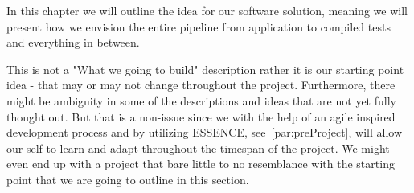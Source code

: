 In this chapter we will outline the idea for our software solution, meaning we will present how we envision the entire pipeline from application to compiled tests and everything in between.

This is not a "What we going to build" description rather it is our starting point idea - that may or may not change throughout the project.
Furthermore, there might be ambiguity in some of the descriptions and ideas that are not yet fully thought out.
But that is a non-issue since we with the help of an agile inspired development process and by utilizing ESSENCE, see~\autoref{par:preProject}, will allow our self to learn and adapt throughout the timespan of the project.
We might even end up with a project that bare little to no resemblance with the starting point that we are going to outline in this section.